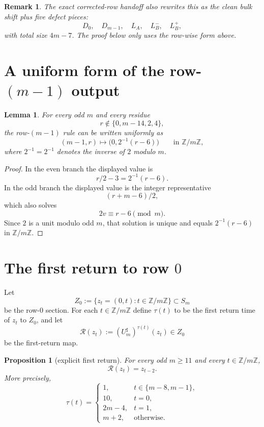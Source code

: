 \documentclass[11pt]{article}
\newtheorem{proposition}[theorem]{Proposition}
\newtheorem{lemma}[theorem]{Lemma}
\newtheorem{remark}[theorem]{Remark}
\newcommand{\Z}{\mathbb Z}
\newcommand{\Sm}{S_m}
\newcommand{\Um}{U_m^{\sharp}}
\newcommand{\half}{2^{-1}}
\begin{document}
\begin{remark}
The exact corrected-row handoff also rewrites this as the clean bulk shift plus
five defect pieces:
\[
D_0,\quad D_{m-1},\quad L_A,\quad L_B^-,\quad L_B^+,
\]
with total size $4m-7$. The proof below only uses the row-wise form above.
\end{remark}

\section{A uniform form of the row-$(m-1)$ output}

\begin{lemma}\label{lem:last-row-unified}
For every odd $m$ and every residue
\[
r\notin\{0,m-14,2,4\},
\]
the row-$(m-1)$ rule can be written uniformly as
\[
(m-1,r)\mapsto \bigl(0,\half(r-6)\bigr)
\qquad\text{in }\Z/m\Z,
\]
where $\half=2^{-1}$ denotes the inverse of $2$ modulo $m$.
\end{lemma}

\begin{proof}
In the even branch the displayed value is
\[
r/2-3 = \half(r-6).
\]
In the odd branch the displayed value is the integer representative
\[
(r+m-6)/2,
\]
which also solves
\[
2v\equiv r-6\pmod m.
\]
Since $2$ is a unit modulo odd $m$, that solution is unique and equals
$\half(r-6)$ in $\Z/m\Z$.
\end{proof}

\section{The first return to row $0$}

Let
\[
Z_0:=\{z_t=(0,t):t\in\Z/m\Z\}
\subset \Sm
\]
be the row-$0$ section. For each $t\in\Z/m\Z$ define $\tau(t)$ to be the first
return time of $z_t$ to $Z_0$, and let
\[
\mathcal R(z_t):=(\Um)^{\tau(t)}(z_t)
\in Z_0
\]
be the first-return map.

\begin{proposition}[explicit first return]\label{prop:first-return}
For every odd $m\ge 11$ and every $t\in\Z/m\Z$,
\[
\mathcal R(z_t)=z_{t-2}.
\]
More precisely,
\[
\tau(t)=
\begin{cases}
1, & t\in\{m-8,m-1\},\\
10, & t=0,\\
2m-4, & t=1,\\
m+2, & \text{otherwise.}
\end{cases}
\]
\end{proposition}
\end{document}
